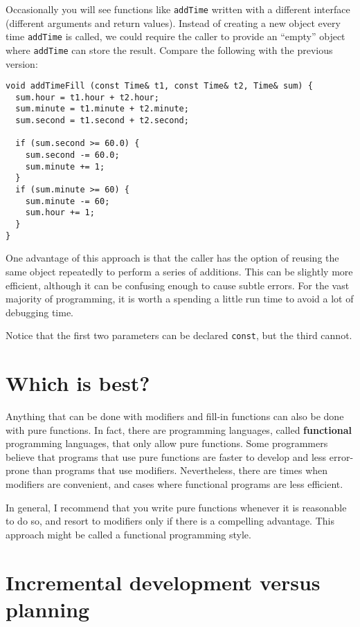Occasionally you will see functions like {\tt addTime} written
with a different interface (different arguments and return values).
Instead of creating a new object every time {\tt addTime} is
called, we could require the caller to provide an ``empty''
object where {\tt addTime} can store the result.  Compare
the following with the previous version:

\begin{verbatim}
void addTimeFill (const Time& t1, const Time& t2, Time& sum) {
  sum.hour = t1.hour + t2.hour;
  sum.minute = t1.minute + t2.minute;
  sum.second = t1.second + t2.second;

  if (sum.second >= 60.0) {
    sum.second -= 60.0;
    sum.minute += 1;
  }
  if (sum.minute >= 60) {
    sum.minute -= 60;
    sum.hour += 1;
  }
}
\end{verbatim}
%
One advantage of this approach is that the caller has the option of
reusing the same object repeatedly to perform a series of additions.
This can be slightly more efficient, although it can be confusing
enough to cause subtle errors.  For the vast majority of programming,
it is worth a spending a little run time to avoid a lot of debugging
time.

Notice that the first two parameters can be declared {\tt const},
but the third cannot.

\section{Which is best?}

Anything that can be done with modifiers and fill-in functions can also
be done with pure functions.  In fact, there are programming
languages, called {\bf functional} programming languages, that only
allow pure functions.  Some programmers believe that programs that use
pure functions are faster to develop and less error-prone than
programs that use modifiers.  Nevertheless, there are times when
modifiers are convenient, and cases where functional programs
are less efficient.

In general, I recommend that you write pure functions whenever
it is reasonable to do so, and resort to modifiers only if there
is a compelling advantage.  This approach might be called a
functional programming style.

\section{Incremental development versus planning}

